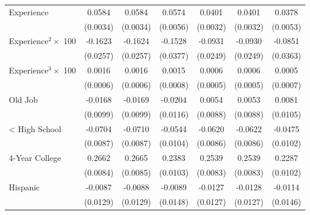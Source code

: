 {\begin{longtable}{l*{6}{c}}
Experience          &      0.0584\sym{***}&      0.0584\sym{***}&      0.0574\sym{***}&      0.0401\sym{***}&      0.0401\sym{***}&      0.0378\sym{***}\\
                    &    (0.0034)         &    (0.0034)         &    (0.0056)         &    (0.0032)         &    (0.0032)         &    (0.0053)         \\
Experience$^2\times$ 100&     -0.1623\sym{***}&     -0.1624\sym{***}&     -0.1528\sym{***}&     -0.0931\sym{***}&     -0.0930\sym{***}&     -0.0851\sym{**} \\
                    &    (0.0257)         &    (0.0257)         &    (0.0377)         &    (0.0249)         &    (0.0249)         &    (0.0363)         \\
Experience$^3\times$ 100&      0.0016\sym{***}&      0.0016\sym{***}&      0.0015\sym{**} &      0.0006         &      0.0006         &      0.0005         \\
                    &    (0.0006)         &    (0.0006)         &    (0.0008)         &    (0.0005)         &    (0.0005)         &    (0.0007)         \\
Old Job             &     -0.0168\sym{*}  &     -0.0169\sym{*}  &     -0.0204\sym{*}  &      0.0054         &      0.0053         &      0.0081         \\
                    &    (0.0099)         &    (0.0099)         &    (0.0116)         &    (0.0088)         &    (0.0088)         &    (0.0105)         \\
< High School       &     -0.0704\sym{***}&     -0.0710\sym{***}&     -0.0544\sym{***}&     -0.0620\sym{***}&     -0.0622\sym{***}&     -0.0475\sym{***}\\
                    &    (0.0087)         &    (0.0087)         &    (0.0104)         &    (0.0086)         &    (0.0086)         &    (0.0102)         \\
4-Year College      &      0.2662\sym{***}&      0.2665\sym{***}&      0.2383\sym{***}&      0.2539\sym{***}&      0.2539\sym{***}&      0.2287\sym{***}\\
                    &    (0.0084)         &    (0.0085)         &    (0.0103)         &    (0.0083)         &    (0.0083)         &    (0.0102)         \\
Hispanic            &     -0.0087         &     -0.0088         &     -0.0089         &     -0.0127         &     -0.0128         &     -0.0114         \\
                    &    (0.0129)         &    (0.0129)         &    (0.0148)         &    (0.0127)         &    (0.0127)         &    (0.0146)         \\

\end{longtable}}
